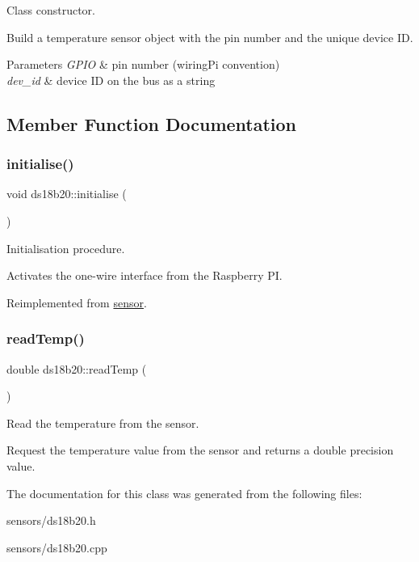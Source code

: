 Class constructor. 

Build a temperature sensor object with the pin number and the unique device ID. 
\begin{DoxyParams}{Parameters}
{\em G\+P\+IO} & pin number (wiring\+Pi convention) \\
\hline
{\em dev\+\_\+id} & device ID on the bus as a string \\
\hline
\end{DoxyParams}


\subsection{Member Function Documentation}
\mbox{\label{classds18b20_a222d770b98aa7c0d6ae27da9756c8979}} 
\subsubsection{\texorpdfstring{initialise()}{initialise()}}
{\footnotesize\ttfamily void ds18b20\+::initialise (\begin{DoxyParamCaption}{ }\end{DoxyParamCaption})\hspace{0.3cm}{\ttfamily [virtual]}}



Initialisation procedure. 

Activates the one-\/wire interface from the Raspberry PI. 

Reimplemented from \mbox{\hyperlink{classsensor_ae1073389f46dd119e2f421a894b7d781}{sensor}}.

\mbox{\label{classds18b20_a479caadfcbf4b1d0fd0867a440900e7d}} 
\subsubsection{\texorpdfstring{read\+Temp()}{readTemp()}}
{\footnotesize\ttfamily double ds18b20\+::read\+Temp (\begin{DoxyParamCaption}{ }\end{DoxyParamCaption})}



Read the temperature from the sensor. 

Request the temperature value from the sensor and returns a double precision value. 

The documentation for this class was generated from the following files\+:\begin{DoxyCompactItemize}
\item 
sensors/ds18b20.\+h\item 
sensors/ds18b20.\+cpp\end{DoxyCompactItemize}
